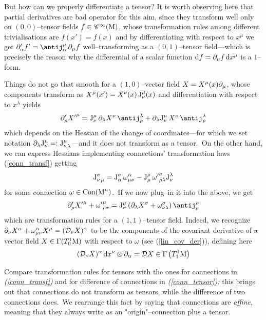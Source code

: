 But how can we properly differentiate a tensor? It is worth observing here that partial derivatives are bad operator for this aim, since they transform well only on $(0,0)$--tensor fields $f\in\mathscr{C}^\infty(\text{\normalfont M})$, whose transformation rules among different trivialisations are $f(x')=f(x)$ and by differentiating with respect to $x^\mu$ we get $\der_\alpha'f'=\antij^\mu_\alpha\,\der_\mu f$ well--transforming as a $(0,1)$--tensor field---which is precisely the reason why the differential of a scalar function $\text{\normalfont d} f=\partial_\mu f\,\text{\normalfont d} x^\mu$ is a $1$--form.

Things do not go that smooth for a $(1,0)$--vector field $X=X^\mu(x)\partial_\mu$, whose components transform as $X^\mu(x')=X^\nu(x)\,\text{\normalfont J}^\mu_\nu(x)$ and differentiation with respect to $x^\lambda$ yields
$$\der_\rho'{X'}^\mu=\J^\mu_\nu\,\der_\lambda X^\nu\,\antij^\lambda_\rho+\der_\lambda\J^\mu_\nu\,X^\nu\,\antij^\lambda_\rho$$
which depends on the Hessian of the change of coordinates---for which we set notation $\partial_\lambda\text{\normalfont J}^\mu_\nu=:{\text{\normalfont J}^\mu_\nu}_\lambda$---and it does not transform as a tensor.\, On the other hand, we can express Hessians implementing connections' transformation laws (\ref{conn_transf}) getting
$${\text{\normalfont J}^\sigma_{\nu}}_\mu=\text{\normalfont J}^\sigma_\alpha\,\omega^\alpha_{\mu\nu}-\text{\normalfont J}^\rho_\mu\,{\omega'}^\sigma_{\rho\lambda}\text{\normalfont J}^\lambda_\nu$$
for some connection $\omega\in\text{\normalfont Con}(\text{\normalfont M}^n)$.\, If we now plug--in it into the above, we get
$$\der_\rho'{X'}^\mu+{\omega'}^\mu_{\rho\sigma}=\J^\mu_\sigma\left(\der_\lambda X^\sigma+\omega^\sigma_{\nu\lambda}\right)\antij^\rho_\rho$$
which are transformation rules for a $(1,1)$--tensor field. Indeed, we recognize $\partial_\nu X^\alpha+\omega^\alpha_{\mu\nu}X^\mu=(\mathcal{D}_\nu X)^\alpha$ to be the components of the covariant derivative of a vector field $X\in\Gamma(T^1_0\text{\normalfont M})$ with respect to $\omega$ (see (\ref{lin_cov_der})), defining here 
$$(\mathcal{D}_\nu X)^\alpha\,\text{\normalfont d} x^\nu\otimes\partial_\alpha=\mathcal{D} X\in\Gamma\left(T^1_1\text{\normalfont M}\right)$$


\begin{remark}\label{connections_affine}
    Compare transformation rules for tensors with the ones for connections in \emph{(\ref{conn_transf})} and for difference of connections in \emph{(\ref{conn_tensor}):} this brings out that connections do not transform as tensors, while the difference of two connections does.\, We rearrange this fact by saying that connections are \emph{affine}, meaning that they always write as an "origin"--connection plus a tensor.
\end{remark}

